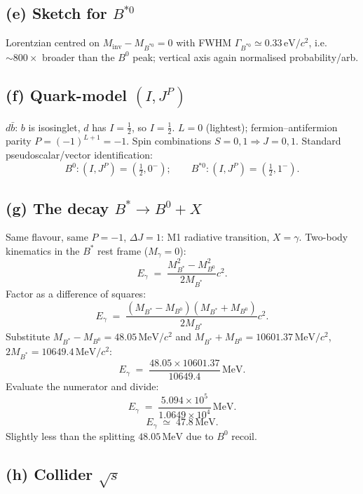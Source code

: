 \documentclass[11pt]{article}
\begin{document}
\subsection*{(e) Sketch for $B^{*0}$}

Lorentzian centred on $M_\text{inv}-M_{B^{*0}}=0$ with FWHM $\Gamma_{B^{*0}}\simeq 0.33\,\text{eV}/c^{2}$, i.e.\ $\sim 800\times$ broader than the $B^{0}$ peak; vertical axis again normalised probability/arb.

\subsection*{(f) Quark-model $(I,J^{P})$}

$d\bar b$: $b$ is isosinglet, $d$ has $I=\tfrac12$, so $I=\tfrac12$. $L=0$ (lightest); fermion--antifermion parity $P=(-1)^{L+1}=-1$. Spin combinations $S=0,1\Rightarrow J=0,1$. Standard pseudoscalar/vector identification:
\begin{equation}
\boxed{\;B^{0}:(I,J^{P})=(\tfrac12,0^{-});\qquad B^{*0}:(I,J^{P})=(\tfrac12,1^{-}).\;}
\end{equation}

\subsection*{(g) The decay $B^{*}\to B^{0}+X$}

Same flavour, same $P=-1$, $\Delta J=1$: M1 radiative transition, $X=\gamma$. Two-body kinematics in the $B^{*}$ rest frame ($M_\gamma=0$):
\[
E_\gamma\;=\;\frac{M_{B^{*}}^{2}-M_{B^{0}}^{2}}{2M_{B^{*}}}c^{2}.
\]
Factor as a difference of squares:
\[
E_\gamma\;=\;\frac{(M_{B^{*}}-M_{B^{0}})(M_{B^{*}}+M_{B^{0}})}{2M_{B^{*}}}c^{2}.
\]
Substitute $M_{B^{*}}-M_{B^{0}}=48.05\,\text{MeV}/c^{2}$ and $M_{B^{*}}+M_{B^{0}}=10601.37\,\text{MeV}/c^{2}$, $2M_{B^{*}}=10649.4\,\text{MeV}/c^{2}$:
\[
E_\gamma\;=\;\frac{48.05\times 10601.37}{10649.4}\,\text{MeV}.
\]
Evaluate the numerator and divide:
\[
E_\gamma\;=\;\frac{5.094\times 10^{5}}{1.0649\times 10^{4}}\,\text{MeV}.
\]
\begin{equation}
\boxed{\;E_\gamma\;\simeq\;47.8\,\text{MeV}.\;}
\end{equation}
Slightly less than the splitting $48.05\,\text{MeV}$ due to $B^{0}$ recoil.

\subsection*{(h) Collider $\sqrt{s}$}
\end{document}
